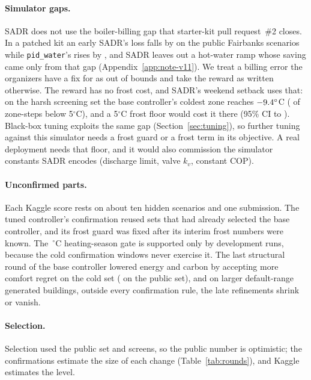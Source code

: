 \documentclass{article}
\begin{document}
\paragraph{Simulator gaps.} SADR does not use the boiler-billing gap that starter-kit pull request~\#2 closes. In a patched kit an early SADR's loss falls by \RFivePrTwoVSevenRelAbs{} on the \RFivePrTwoVSevenN{} public Fairbanks scenarios while \texttt{pid\_water}'s rises by \RFivePrTwoPidRelAbs, and SADR leaves out a hot-water ramp whose saving came only from that gap (Appendix~\ref{app:note-v11}). We treat a billing error the organizers have a fix for as out of bounds and take the reward as written otherwise. The reward has no frost cost, and SADR's weekend setback uses that: on the harsh screening set the base controller's coldest zone reaches $-9.4^\circ$C (\RElvBelowFiveHS{} of zone-steps below 5$^\circ$C), and a 5$^\circ$C frost floor would cost it \RElvFrostHsRel{} there (95\% CI \RElvFrostHsLo{} to \RElvFrostHsHi). Black-box tuning exploits the same gap (Section~\ref{sec:tuning}), so further tuning against this simulator needs a frost guard or a frost term in its objective. A real deployment needs that floor, and it would also commission the simulator constants SADR encodes (discharge limit, valve $k_v$, constant COP).

\paragraph{Unconfirmed parts.} Each Kaggle score rests on about ten hidden scenarios and one submission. The tuned controller's confirmation reused sets that had already selected the base controller, and its frost guard was fixed after its interim frost numbers were known. The \RTenSeasonOatC\,$^\circ$C heating-season gate is supported only by development runs, because the cold confirmation windows never exercise it. The last structural round of the base controller lowered energy and carbon by accepting \RTenComfRiseHCThree{} more comfort regret on the cold set (\RTenComfRisePub{} on the public set), and on larger default-range generated buildings, outside every confirmation rule, the late refinements shrink or vanish.

\paragraph{Selection.} Selection used the public set and screens, so the public number is optimistic; the confirmations estimate the size of each change (Table~\ref{tab:rounds}), and Kaggle estimates the level.
\end{document}

